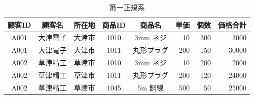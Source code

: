 \documentclass[dvipdfmx,autodetect-engine,titlepage]{jsarticle}
\begin{document}
\begin{table}[h]
  \centering
  \caption{第一正規系}
  \begin{tabular}{|c|c|c|c|c|r|r|r|}
  \hline
  顧客ID & 顧客名  & 所在地 & 商品ID & 商品名    & \multicolumn{1}{l|}{単価} & \multicolumn{1}{l|}{個数} & \multicolumn{1}{l|}{価格合計} \\ \hline\hline
  A001 & 大津電子 & 大津市 & 1010 & 3mm ネジ & 10                      & 300                     & 3000                      \\ \hline
  A001 & 大津電子 & 大津市 & 1011 & 丸形プラグ  & 200                     & 150                     & 30000                     \\ \hline
  A002 & 草津精工 & 草津市 & 1010 & 3mm ネジ & 10                      & 200                     & 2000                      \\ \hline
  A002 & 草津精工 & 草津市 & 1011 & 丸形プラグ  & 200                     & 120                     & 24000                     \\ \hline
  A002 & 草津精工 & 草津市 & 1045 & 5m 銅線  & 500                     & 50                      & 25000                     \\ \hline
  \end{tabular}
  \end{table}
\end{document}
